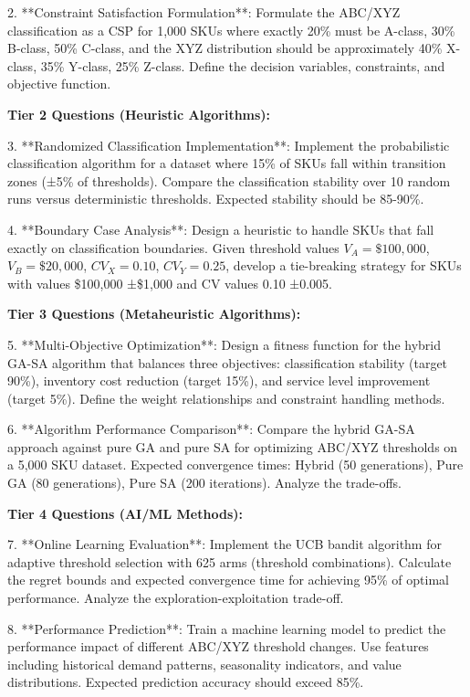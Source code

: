 \documentclass{article}
\begin{document}
2. **Constraint Satisfaction Formulation**: Formulate the ABC/XYZ classification as a CSP for 1,000 SKUs where exactly 20\% must be A-class, 30\% B-class, 50\% C-class, and the XYZ distribution should be approximately 40\% X-class, 35\% Y-class, 25\% Z-class. Define the decision variables, constraints, and objective function.

\textbf{Tier 2 Questions (Heuristic Algorithms):}

3. **Randomized Classification Implementation**: Implement the probabilistic classification algorithm for a dataset where 15\% of SKUs fall within transition zones (±5\% of thresholds). Compare the classification stability over 10 random runs versus deterministic thresholds. Expected stability should be 85-90\%.

4. **Boundary Case Analysis**: Design a heuristic to handle SKUs that fall exactly on classification boundaries. Given threshold values $V_A = \$100,000$, $V_B = \$20,000$, $CV_X = 0.10$, $CV_Y = 0.25$, develop a tie-breaking strategy for SKUs with values \$100,000 ±\$1,000 and CV values 0.10 ±0.005.

\textbf{Tier 3 Questions (Metaheuristic Algorithms):}

5. **Multi-Objective Optimization**: Design a fitness function for the hybrid GA-SA algorithm that balances three objectives: classification stability (target 90\%), inventory cost reduction (target 15\%), and service level improvement (target 5\%). Define the weight relationships and constraint handling methods.

6. **Algorithm Performance Comparison**: Compare the hybrid GA-SA approach against pure GA and pure SA for optimizing ABC/XYZ thresholds on a 5,000 SKU dataset. Expected convergence times: Hybrid (50 generations), Pure GA (80 generations), Pure SA (200 iterations). Analyze the trade-offs.

\textbf{Tier 4 Questions (AI/ML Methods):}

7. **Online Learning Evaluation**: Implement the UCB bandit algorithm for adaptive threshold selection with 625 arms (threshold combinations). Calculate the regret bounds and expected convergence time for achieving 95\% of optimal performance. Analyze the exploration-exploitation trade-off.

8. **Performance Prediction**: Train a machine learning model to predict the performance impact of different ABC/XYZ threshold changes. Use features including historical demand patterns, seasonality indicators, and value distributions. Expected prediction accuracy should exceed 85\%.
\end{document}
